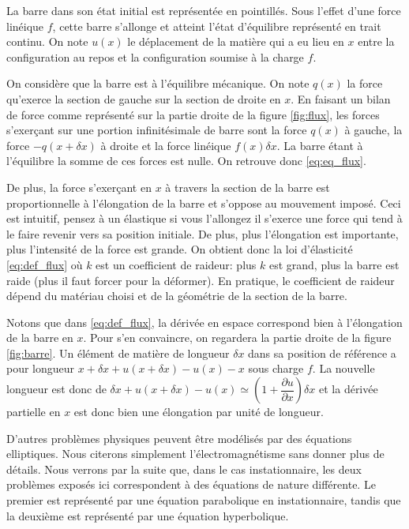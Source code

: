 \documentclass[12pt,a4paper,twoside]{article}
\begin{document}
La barre dans son \'etat initial est repr\'esent\'ee en pointill\'es.
Sous l'effet d'une force lin\'eique $f$, cette barre s'allonge
et atteint l'\'etat d'\'equilibre repr\'esent\'e en trait continu.
On note $u(x)$ le d\'eplacement de la mati\`ere qui a eu lieu en $x$ entre
la configuration au repos et la configuration soumise \`a la charge $f$.


On consid\`ere que la barre est \`a l'\'equilibre m\'ecanique.
On note $q(x)$ la force qu'exerce la section de gauche sur la section de droite
en $x$. En faisant un bilan de force comme repr\'esent\'e 
sur la partie droite de la figure \ref{fig:flux},
les forces s'exer\c{c}ant sur une portion infinit\'esimale de barre sont
la force $q(x)$ \`a gauche, la force $-q(x+\delta x)$ \`a droite
et la force lin\'eique $f(x) \delta x$. La barre \'etant \`a l'\'equilibre la somme de ces forces
est nulle. On retrouve donc \eqref{eq:eq_flux}.


De plus, la force s'exer\c{c}ant en $x$ \`a travers la section de la barre est 
proportionnelle \`a l'\'elongation de la barre et s'oppose au mouvement impos\'e.
Ceci est intuitif, pensez \`a un \'elastique si vous l'allongez il s'exerce une force
qui tend \`a le faire revenir vers sa position initiale. De plus, plus l'\'elongation
est importante, plus l'intensit\'e de la force est grande.
On obtient donc la loi d'\'elasticit\'e \eqref{eq:def_flux}
o\`u $k$ est un coefficient de raideur:
plus $k$ est grand, plus la barre est raide (plus il faut forcer pour la d\'eformer).
En pratique, le coefficient de raideur d\'epend du mat\'eriau choisi et
de la g\'eom\'etrie de la section de la barre.

Notons que dans \eqref{eq:def_flux}, la d\'eriv\'ee en espace correspond bien \`a 
l'\'elongation de la barre en $x$. Pour s'en convaincre, on regardera la 
partie droite de la figure \ref{fig:barre}. Un \'el\'ement de mati\`ere de longueur
$\delta x$ dans sa position de r\'ef\'erence a pour longueur 
$x + \delta x + u(x+\delta x) - u(x) - x$ sous charge $f$.
La nouvelle longueur est donc de $\delta x + u(x+\delta x) - u(x) 
\simeq \left(1 + \dfrac{\partial u}{\partial x} \right) \delta x$
et la d\'eriv\'ee partielle en $x$ est donc bien une \'elongation par unit\'e de longueur.


D'autres probl\`emes physiques peuvent \^etre mod\'elis\'es par des \'equations elliptiques.
Nous citerons simplement l'\'electromagn\'etisme sans donner plus de d\'etails.
Nous verrons par la suite que, dans le cas instationnaire,
les deux probl\`emes expos\'es ici correspondent \`a 
des \'equations de nature diff\'erente.
Le premier est repr\'esent\'e par une \'equation parabolique en instationnaire,
tandis que la deuxi\`eme est repr\'esent\'e par une \'equation hyperbolique.
\end{document}
